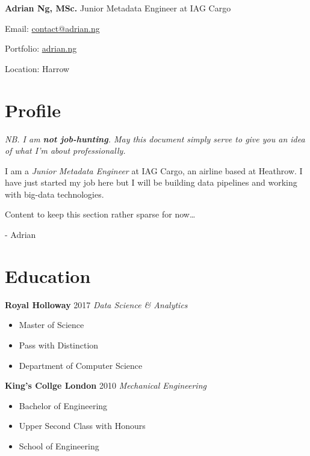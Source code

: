 \documentclass[letterpaper,11pt]{article}
\begin{document}
\noindent
\Large
\textbf{Adrian Ng, MSc.}
\newline
\small
Junior Metadata Engineer at IAG Cargo
\newline
\begin{description*}
	\item[Email:] \href{mailto:contact@adrian.ng}{contact@adrian.ng}
	\item[Portfolio:] \href{https://adrian.ng}{adrian.ng}
	\item[Location:] Harrow
\end{description*}
\hfill
\vspace{0.25cm}
\noindent
\begin{minipage}[t]{0.5\linewidth}
	\section{Profile}
	\textit{NB. I am \textbf{not job-hunting}. May this document simply serve to give you an idea of what I'm about professionally.}
	\par\quad

	I am a \textit{Junior Metadata Engineer} at IAG Cargo, an airline based at Heathrow. I have just started my job here but I will be building data pipelines and working with big-data technologies.
	\par\quad

	Content to keep this section rather sparse for now\dots
	\par\quad

		- Adrian
\end{minipage}
\hspace{0.2cm}
\begin{minipage}[t]{0.3\linewidth}
	\section{Education}
	\textbf{Royal Holloway} \hfill 2017
	\newline
	\textit{Data Science \& Analytics}
	\begin{itemize}[leftmargin=*, itemsep=0.1em]
		\item	Master of Science
		\item	Pass with Distinction
		\item 	Department of Computer Science
	\end{itemize}
	\vspace{0.15cm}
	\textbf{King's Collge London} \hfill 2010
	\newline
	\textit{Mechanical Engineering}
	\begin{itemize}[leftmargin=*, itemsep=0.1em]
		\item Bachelor of Engineering
		\item Upper Second Class with Honours
		\item School of Engineering
	\end{itemize}
\end{minipage}
\end{document}

